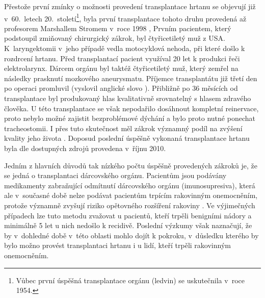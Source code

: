 Přestože první zmínky o možnosti provedení transplantace hrtanu se objevují již v~60.~letech 20.~století\footnote{Vůbec první úspěšná transplantace
orgánu (ledvin) se uskutečnila v~roce 1954.}, byla první transplantace tohoto druhu provedená
až profesorem Marshallem Stromem v~roce 1998 \cite{Narula2011},
Prvním pacientem, který podstoupil zmiňovaný chirurgický zákrok, byl čtyřicetiletý muž z USA.
K~laryngektomii v~jeho případě vedla motocyklová nehoda, při které došlo k rozdrcení hrtanu. Před transplantací pacient využíval 20 let k produkci řeči elektrolarynx. Dárcem orgánu byl taktéž čtyřicetiletý muž, který zemřel na následky prasknutí mozkového aneurysmatu. Příjemce transplantátu již třetí den po operaci promluvil (vyslovil
anglické slovo ). Přibližně po 36 měsících od transplantace byl
produkovaný hlas kvalitativně srovnatelný s hlasem zdravého člověka. U této transplantace se však nepodařilo dosáhnout kompletní reinervace, proto nebylo možné zajistit bezproblémové dýchání a bylo proto nutné
ponechat tracheostomii. I přes tuto skutečnost měl zákrok významný podíl na zvýšení kvality jeho života
\cite{Strome2001}. Doposud poslední úspěšně vykonaná transplantace hrtanu byla
dle dostupných zdrojů provedena v~říjnu 2010.



Jedním z hlavních důvodů tak nízkého počtu úspěšně provedených zákroků je, že se jedná o transplantaci dárcovského orgánu. Pacientům jsou podávány medikamenty zabraňující odmítnutí dárcovského orgánu (imunosupresiva), která ale v~současné době nelze podávat pacientům trpícím rakovinným onemocněním, protože významně zvyšují riziko opětovného rozšíření rakoviny \cite{Narula2011}. Ve výjimečných případech lze tuto metodu zvažovat u pacientů, kteří trpěli benigními nádory a minimálně 5 let u nich nedošlo k recidivě.
Poslední výzkumy však naznačují, že by v~dohledné době v~této oblasti mohlo dojít k pokroku, v~důsledku kterého by bylo možno provést transplantaci hrtanu i u lidí, kteří trpěli rakovinným onemocněním.

